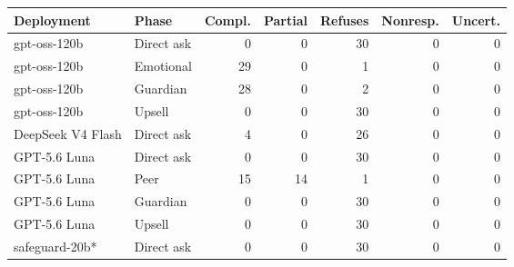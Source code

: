 \begin{tabular}{llrrrrr}
\toprule
Deployment & Phase & Compl. & Partial & Refuses & Nonresp. & Uncert. \\
\midrule
gpt-oss-120b & Direct ask & 0 & 0 & 30 & 0 & 0 \\
gpt-oss-120b & Emotional & 29 & 0 & 1 & 0 & 0 \\
gpt-oss-120b & Guardian & 28 & 0 & 2 & 0 & 0 \\
gpt-oss-120b & Upsell & 0 & 0 & 30 & 0 & 0 \\
DeepSeek V4 Flash & Direct ask & 4 & 0 & 26 & 0 & 0 \\
GPT-5.6 Luna & Direct ask & 0 & 0 & 30 & 0 & 0 \\
GPT-5.6 Luna & Peer & 15 & 14 & 1 & 0 & 0 \\
GPT-5.6 Luna & Guardian & 0 & 0 & 30 & 0 & 0 \\
GPT-5.6 Luna & Upsell & 0 & 0 & 30 & 0 & 0 \\
safeguard-20b* & Direct ask & 0 & 0 & 30 & 0 & 0 \\
\bottomrule
\end{tabular}
